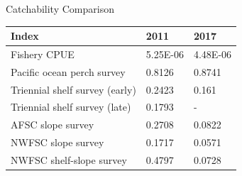\documentclass[pdf]{beamer}\usepackage[]{graphicx}\usepackage[]{color}
\begin{document}
\begin{frame}{Catchability Comparison}
  \begin{table}[ht]
  \centering
  \begin{tabular}{p{2in}p{0.7in}p{0.7in}}
  Index & 2011 & 2017 \\ 
  \hline
  Fishery CPUE & 5.25E-06 & 4.48E-06 \\ 
  Pacific ocean perch survey & 0.8126 & 0.8741 \\
  Triennial shelf survey (early)& 0.2423 & 0.161 \\ 
  Triennial shelf survey (late) & 0.1793 & - \\
  AFSC slope survey & 0.2708 & 0.0822 \\ 
  NWFSC slope survey & 0.1717 & 0.0571 \\
  NWFSC shelf-slope survey & 0.4797 & 0.0728 \\
  \hline
  \end{tabular}
  \end{table}
\end{frame}


  
\end{document}
